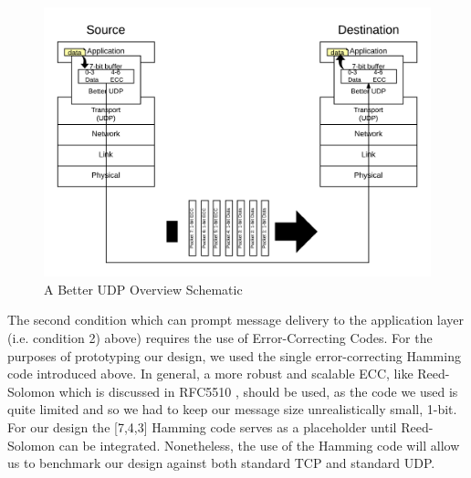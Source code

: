 \documentclass[conference]{IEEEtran}
\theoremstyle{definition}
\begin{document}
\begin{figure}[h!]                                                          %
\centering                                                                  %
  \includegraphics[scale=0.125]{PNGs/System_Schematic-Overview}             %
\caption{A Better UDP Overview Schematic}                                   %
\label{overview_schematic}                                                  %
\end{figure}                                                                %

The second condition which can prompt message
delivery to the application layer (i.e. condition 2)
above) requires the use of Error-Correcting Codes.
For the purposes of prototyping our design, we
used the single error-correcting Hamming
code introduced above.  In general, a more robust
and scalable ECC, like Reed-Solomon which is discussed
in RFC5510 \cite{lacan2009reed}, should be used, as the
code we used is quite limited and so we had to keep
our message size unrealistically small, 1-bit.
For our design the [7,4,3] Hamming code serves as a
placeholder until Reed-Solomon can be integrated.
Nonetheless, the use of the Hamming code will
allow us to benchmark our design against both
standard TCP and standard UDP.
\end{document}
